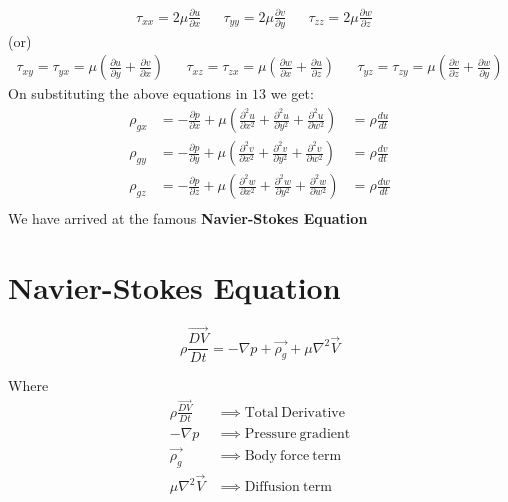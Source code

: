 \documentclass{article}
\begin{document}
\begin{align*}
    {\tau_{xx}=2\mu \frac{\partial{u}}{\partial{x}}}  &  & {\tau_{yy}=2\mu \frac{\partial{v}}{\partial{y}}} & & {\tau_{zz}=2\mu \frac{\partial{w}}{\partial{z}}} &
\end{align*}
(or)
\begin{align*}
    \tau_{xy}=\tau_{yx}=\mu \left(\frac{\partial{u}}{\partial{y}}+\frac{\partial{v}}{\partial{x}}\right)  &  & \tau_{xz}=\tau_{zx}=\mu \left(\frac{\partial{w}}{\partial{x}}+\frac{\partial{u}}{\partial{z}}\right)  &  & \tau_{yz}=\tau_{zy}=\mu \left(\frac{\partial{v}}{\partial{z}}+\frac{\partial{w}}{\partial{y}}\right)  
\end{align*}
On substituting the above equations in $13$ we get:
\begin{equation}
\begin{aligned}
\rho_{gx}&=-\frac{\partial{p}}{\partial{x}}+\mu \left(\frac{\partial^2{u}}{\partial{x^2}}+\frac{\partial^2{u}}{\partial{y^2}}+\frac{\partial^2{u}}{\partial{w^2}}\right)&=\rho\frac{du}{dt}\\
\rho_{gy}&=-\frac{\partial{p}}{\partial{y}}+\mu \left(\frac{\partial^2{v}}{\partial{x^2}}+\frac{\partial^2{v}}{\partial{y^2}}+\frac{\partial^2{v}}{\partial{w^2}}\right)&=\rho\frac{dv}{dt}\\
\rho_{gz}&=-\frac{\partial{p}}{\partial{z}}+\mu \left(\frac{\partial^2{w}}{\partial{x^2}}+\frac{\partial^2{w}}{\partial{y^2}}+\frac{\partial^2{w}}{\partial{w^2}}\right)&=\rho\frac{dw}{dt}\\
\end{aligned}
\end{equation}
We have arrived at the famous \textbf{Navier-Stokes Equation}
\section*{Navier-Stokes Equation}
\begin{center}
\begin{tcolorbox}
\LARGE$$\rho \frac{\overrightarrow{DV}}{Dt}=-\nabla p+\overrightarrow{\rho_{g}}+\mu \nabla^2\overrightarrow{V}$$
\end{tcolorbox}
\end{center}
Where
\begin{equation*}
    \begin{aligned}
        \rho \frac{\overrightarrow{DV}}{Dt}&\implies \mathrm{Total\ Derivative}\\
        -\nabla p&\implies \mathrm{Pressure\ gradient}\\
        \overrightarrow{\rho_{g}} &\implies \mathrm{Body\ force\ term} \\
        \mu \nabla^2\overrightarrow{V}&\implies \mathrm{Diffusion\ term}
    \end{aligned}
\end{equation*}
\end{document}
